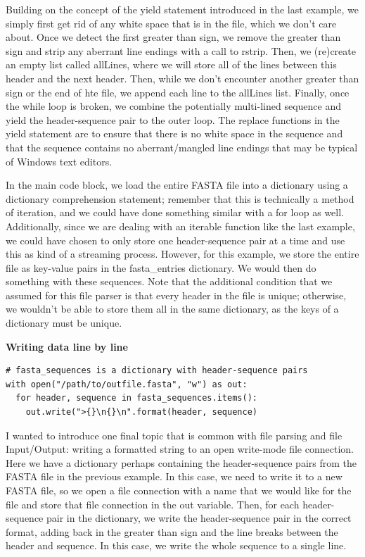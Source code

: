 \documentclass[a4paper,11pt]{article}
\begin{document}
Building on the concept of the yield statement introduced in the last example, we simply first 
get rid of any white space that is in the file, which we don't care about.  Once we detect the 
first greater than sign, we remove the greater than sign and strip any aberrant line endings 
with a call to rstrip.  Then, we (re)create an empty list called allLines, where we will store 
all of the lines between this header and the next header.  Then, while we don't encounter another 
greater than sign or the end of hte file, we append each line to the allLines list.  Finally, 
once the while loop is broken, we combine the potentially multi-lined sequence and yield the 
header-sequence pair to the outer loop.  The replace functions in the yield statement are 
to ensure that there is no white space in the sequence and that the sequence contains no 
aberrant/mangled line endings that may be typical of Windows text editors.  \par

In the main code block, we load the entire FASTA file into a dictionary using a dictionary 
comprehension statement; remember that this is technically a method of iteration, and we 
could have done something similar with a for loop as well.  Additionally, since we are 
dealing with an iterable function like the last example, we could have chosen to only 
store one header-sequence pair at a time and use this as kind of a streaming process.  
However, for this example, we store the entire file as key-value pairs in the fasta\_entries 
dictionary.  We would then do something with these sequences.  Note that the additional 
condition that we assumed for this file parser is that every header in the file is unique; 
otherwise, we wouldn't be able to store them all in the same dictionary, as the keys of a 
dictionary must be unique.



\pagebreak
\textbf{Writing data line by line}
\vspace{3mm}
\begin{lstlisting}
# fasta_sequences is a dictionary with header-sequence pairs
with open("/path/to/outfile.fasta", "w") as out:
  for header, sequence in fasta_sequences.items():
    out.write(">{}\n{}\n".format(header, sequence)
\end{lstlisting}
\vspace{3mm}

I wanted to introduce one final topic that is common with file parsing and file Input/Output: writing 
a formatted string to an open write-mode file connection.  Here we have a dictionary perhaps 
containing the header-sequence pairs from the FASTA file in the previous example.  In this case, 
we need to write it to a new FASTA file, so we open a file connection with a name that we would 
like for the file and store that file connection in the out variable.  Then, for each header-
sequence pair in the dictionary, we write the header-sequence pair in the correct format, 
adding back in the greater than sign and the line breaks between the header and sequence.  
In this case, we write the whole sequence to a single line.  \par
\end{document}
